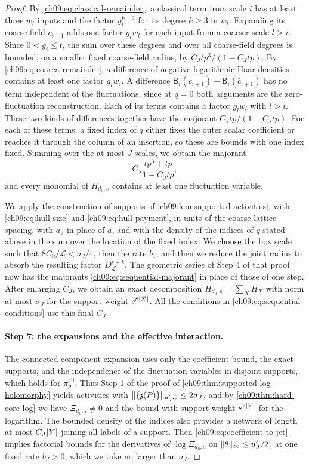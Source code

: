\begin{proof}
By \eqref{ch09:eq:classical-remainder}, a classical term from scale $i$ has at least three $w_i$ inputs and the factor $g_i^{k-2}$ for its degree $k\ge3$ in $w_i$. Expanding its coarse field $c_{i+1}$ adds one factor $g_lw_l$ for each input from a coarser scale $l>i$. Since $0<g_i\le t$, the sum over these degrees and over all coarse-field degrees is bounded, on a smaller fixed coarse-field radius, by $C_Jtp^3/(1-C_Jtp)$. By \eqref{ch09:eq:coarea-remainder}, a difference of negative logarithmic Haar densities contains at least one factor $g_iw_i$. A difference $\mathsf B_i(c_{i+1})-\mathsf B_i(\widehat c_{i+1})$ has no term independent of the fluctuations, since at $q=0$ both arguments are the zero-fluctuation reconstruction. Each of its terms contains a factor $g_lw_l$ with $l>i$. These two kinds of differences together have the majorant $C_Jtp/(1-C_Jtp)$. For each of these terms, a fixed index of $q$ either fixes the outer scalar coefficient or reaches it through the column of an insertion, so these are bounds with one index fixed. Summing over the at most $J$ scales, we obtain the majorant
\begin{equation}\label{ch09:eq:sequential-majorant}
 C_J\frac{tp^3+tp}{1-C_Jtp},
\end{equation}
and every monomial of $H_{d_0,s}$ contains at least one fluctuation variable.

We apply the construction of supports of \cref{ch09:lem:supported-activities}, with \eqref{ch09:eq:hull-size} and \eqref{ch09:eq:hull-payment}, in units of the coarse lattice spacing, with $a_J$ in place of $a$, and with the density of the indices of $q$ stated above in the sum over the location of the fixed index. We choose the box scale such that $8C_0/\mathscr L<a_J/4$, then the rate $b_1$, and then we reduce the joint radius to absorb the resulting factor $D_{\mathscr L}^{r+k}$. The geometric series of Step 4 of that proof now has the majorants \eqref{ch09:eq:sequential-majorant} in place of those of one step. After enlarging $C_J$, we obtain an exact decomposition $H_{d_0,s}=\sum_XH_X$ with norm at most $\sigma_J$ for the support weight $e^{8\lvert X\rvert}$. All the conditions in \eqref{ch09:eq:sequential-conditions} use this final $C_J$.

\paragraph{Step 7: the expansions and the effective interaction.}
The connected-component expansion uses only the coefficient bound, the exact supports, and the independence of the fluctuation variables in disjoint supports, which holds for $\pi_p^{\mathrm{all}}$. Thus Step 1 of the proof of \cref{ch09:thm:supported-log-holomorphy} yields activities with $\lVert \{\mathfrak z(P)\}\rVert_{u_J',5}\le2\sigma_J$, and by \cref{ch09:thm:hard-core-log} we have $\Xi_{d_0,s}\ne0$ and the bound with support weight $e^{2\lvert Y\rvert}$ for the logarithm. The bounded density of the indices also provides a network of length at most $C_J\lvert Y\rvert$ joining all labels of a support. Then \eqref{ch09:eq:coefficient-to-jet} implies factorial bounds for the derivatives of $\log\Xi_{d_0,s}$ on $\lVert \theta\rVert_\infty\le u_J'/2$, at one fixed rate $b_J>0$, which we take no larger than $a_J$.


\end{proof}
